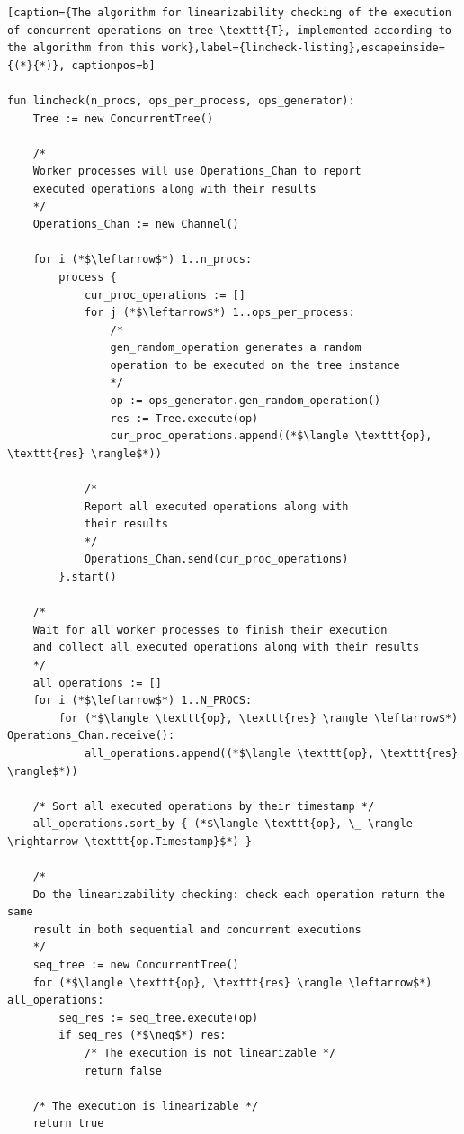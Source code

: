 \documentclass[times, dvipsnames,%
               languages={russian,english} %
              ]{itmo-student-thesis}
\begin{document}
\renewcommand{\lstlistingname}{Listing}
\begin{lstlisting}[caption={The algorithm for linearizability checking of the execution of concurrent operations on tree \texttt{T}, implemented according to the algorithm from this work},label={lincheck-listing},escapeinside={(*}{*)}, captionpos=b]

fun lincheck(n_procs, ops_per_process, ops_generator):
    Tree := new ConcurrentTree()

    /*
    Worker processes will use Operations_Chan to report 
    executed operations along with their results
    */
    Operations_Chan := new Channel()
    
    for i (*$\leftarrow$*) 1..n_procs:
        process {
            cur_proc_operations := []
            for j (*$\leftarrow$*) 1..ops_per_process:
                /* 
                gen_random_operation generates a random
                operation to be executed on the tree instance
                */
                op := ops_generator.gen_random_operation()
                res := Tree.execute(op)
                cur_proc_operations.append((*$\langle \texttt{op}, \texttt{res} \rangle$*))
                
            /*
            Report all executed operations along with
            their results
            */
            Operations_Chan.send(cur_proc_operations)
        }.start()
        
    /* 
    Wait for all worker processes to finish their execution 
    and collect all executed operations along with their results
    */
    all_operations := []
    for i (*$\leftarrow$*) 1..N_PROCS:
        for (*$\langle \texttt{op}, \texttt{res} \rangle \leftarrow$*) Operations_Chan.receive():
            all_operations.append((*$\langle \texttt{op}, \texttt{res} \rangle$*))
        
    /* Sort all executed operations by their timestamp */
    all_operations.sort_by { (*$\langle \texttt{op}, \_ \rangle \rightarrow \texttt{op.Timestamp}$*) }
    
    /*
    Do the linearizability checking: check each operation return the same
    result in both sequential and concurrent executions
    */
    seq_tree := new ConcurrentTree()
    for (*$\langle \texttt{op}, \texttt{res} \rangle \leftarrow$*) all_operations:
        seq_res := seq_tree.execute(op)
        if seq_res (*$\neq$*) res:
            /* The execution is not linearizable */
            return false

    /* The execution is linearizable */
    return true 
\end{lstlisting}
\end{document}
